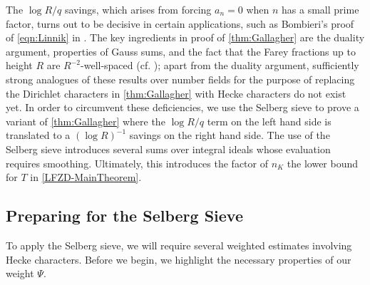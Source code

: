 \documentclass[12pt,psamsfonts]{amsart}
\theoremstyle{definition}
\theoremstyle{remark}
\numberwithin{equation}{section}
\theoremstyle{plain}
\theoremstyle{remark}
\renewcommand{\1}{ {\bf 1}}
\begin{document}
The $\log R/q$ savings, which arises from forcing $a_n=0$ when $n$ has a small prime factor, turns out to be decisive in certain applications, such as Bombieri's proof of \eqref{eqn:Linnik} in \cite{Bombieri}.  The key ingredients in proof of \cref{thm:Gallagher} are the duality argument, properties of Gauss sums, and the fact that the Farey fractions up to height $R$ are $R^{-2}$-well-spaced (cf. \cite[Sections 7.3-7.4]{IK}); apart from the duality argument, sufficiently strong analogues of these results over number fields for the purpose of replacing the Dirichlet characters in \cref{thm:Gallagher} with Hecke characters do not exist yet.  In order to circumvent these deficiencies, we use the Selberg sieve to prove a variant of \cref{thm:Gallagher} where the $\log R/q$ term on the left hand side is translated to a $(\log R)^{-1}$ savings on the right hand side.  The use of the Selberg sieve introduces several sums over integral ideals whose evaluation requires smoothing.  Ultimately, this introduces the factor of $n_K$ the lower bound for $T$ in \cref{LFZD-MainTheorem}.

\subsection{Preparing for the Selberg Sieve} To apply the Selberg sieve, we will require several weighted estimates involving Hecke characters. Before we begin, we highlight the necessary properties of our weight $\Psi$. 
 
\end{document}
